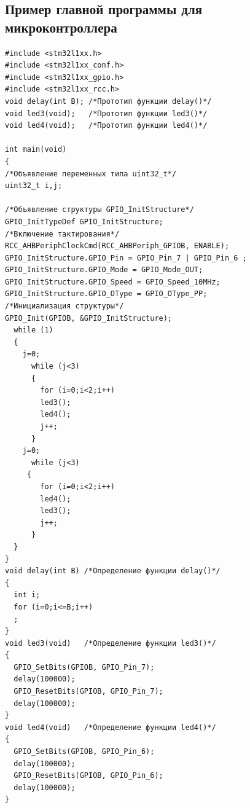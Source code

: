 \subsection{Пример главной программы для микроконтроллера}
\begin{verbatim}
#include <stm32l1xx.h>
#include <stm32l1xx_conf.h>
#include <stm32l1xx_gpio.h>
#include <stm32l1xx_rcc.h> 
void delay(int B); /*Прототип функции delay()*/
void led3(void);   /*Прототип функции led3()*/
void led4(void);   /*Прототип функции led4()*/

int main(void)
{
/*Объявление переменных типа uint32_t*/   
uint32_t i,j; 

/*Объявление структуры GPIO_InitStructure*/ 
GPIO_InitTypeDef GPIO_InitStructure; 
/*Включение тактирования*/
RCC_AHBPeriphClockCmd(RCC_AHBPeriph_GPIOB, ENABLE);   
GPIO_InitStructure.GPIO_Pin = GPIO_Pin_7 | GPIO_Pin_6 ;
GPIO_InitStructure.GPIO_Mode = GPIO_Mode_OUT;
GPIO_InitStructure.GPIO_Speed = GPIO_Speed_10MHz;
GPIO_InitStructure.GPIO_OType = GPIO_OType_PP;
/*Инициализация структуры*/        
GPIO_Init(GPIOB, &GPIO_InitStructure);  
  while (1)
  {
    j=0;
      while (j<3)
      {
        for (i=0;i<2;i++)
        led3();
        led4();
        j++;       
      }
    j=0;
      while (j<3)
     {
        for (i=0;i<2;i++)
        led4();
        led3();
        j++;       
      }         
  }
}
void delay(int B) /*Определение функции delay()*/
{
  int i;  
  for (i=0;i<=B;i++)
  ;
}
void led3(void)   /*Определение функции led3()*/
{
  GPIO_SetBits(GPIOB, GPIO_Pin_7);
  delay(100000);
  GPIO_ResetBits(GPIOB, GPIO_Pin_7);
  delay(100000);
}
void led4(void)   /*Определение функции led4()*/
{
  GPIO_SetBits(GPIOB, GPIO_Pin_6);
  delay(100000);
  GPIO_ResetBits(GPIOB, GPIO_Pin_6);
  delay(100000);
}
\end{verbatim}

